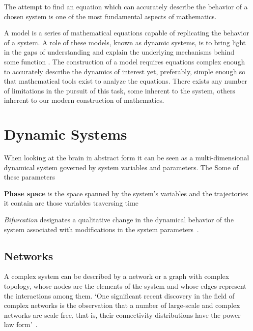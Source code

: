 \documentclass[../../Orator.tex]{subfiles}
\begin{document}
The attempt to find an equation which can accurately describe the behavior of a chosen system is one of the most fundamental aspects of mathematics.

A model is a series of mathematical equations capable of replicating the behavior of a system. A role of these models, known as dynamic systems, is to bring light in the gaps of understanding and explain the underlying mechanisms behind some function \citelater. 
The construction of a model requires equations complex enough to accurately describe the dynamics of interest yet, preferably, simple enough so that mathematical tools exist to analyze the equations\footnotemark. 
There exists any number of limitations in the pursuit of this task, some inherent to the system, others inherent to our modern construction of mathematics.

\section{Dynamic Systems}

When looking at the brain in abstract form it can be seen as a multi-dimensional dynamical system governed by system variables and parameters.
The 
Some of these parameters

\textbf{Phase space} is the space spanned by the system's variables and the trajectories it contain are those variables traversing time

\textit{Bifurcation} designates a qualitative change in the dynamical behavior of the system associated with modifications in the system parameters~\cite{STEFANESCU2012748}.


\subsection*{Networks}
A complex system can be described by a network or a graph with complex topology, whose nodes are the elements of the system and whose edges represent the interactions among them. `One significant recent discovery in the field of complex networks is the observation that a number of
large-scale and complex networks are scale-free, that is, their connectivity distributions have the
power-law form'~\cite{wang2002synchronization}.
\end{document}
